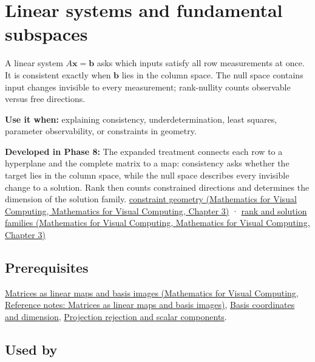 \hypertarget{appendix-8572a4a060c1}{}\label{referencestart:appendix-8572a4a060c1}
\section{Linear systems and fundamental subspaces}\label{appendix-8572a4a060c1-linear-systems-and-fundamental-subspaces}

A linear system \(A\mathbf x=\mathbf b\) asks which inputs satisfy all row measurements at once. It is consistent exactly when \(\mathbf b\) lies in the column space. The null space contains input changes invisible to every measurement; rank-nullity counts observable versus free directions.

\textbf{Use it when:} explaining consistency, underdetermination, least squares, parameter observability, or constraints in geometry.

\textbf{Developed in Phase 8:} The expanded treatment connects each row to a hyperplane and the complete matrix to a map: consistency asks whether the target lies in the column space, while the null space describes every invisible change to a solution. Rank then counts constrained directions and determines the dimension of the solution family. \href{../02-Mathematics-for-Visual-Computing/main.pdf\#nameddest=01-foundations-i-ch019-a-system-is-an-intersection-of-constraints}{constraint geometry (Mathematics for Visual Computing, Mathematics for Visual Computing, Chapter 3)} · \href{../02-Mathematics-for-Visual-Computing/main.pdf\#nameddest=01-foundations-i-ch019-rank-the-four-spaces-and-the-shape-of-the-answer}{rank and solution families (Mathematics for Visual Computing, Mathematics for Visual Computing, Chapter 3)}

\subsection{Prerequisites}\label{appendix-8572a4a060c1-prerequisites}

\href{../02-Mathematics-for-Visual-Computing/main.pdf\#nameddest=appendix-bd39c3bf5d64}{Matrices as linear maps and basis images (Mathematics for Visual Computing, Reference notes: Matrices as linear maps and basis images)}, \hyperref[appendix-ce0341f7ea0d]{Basis coordinates and dimension}, \hyperref[appendix-505a502c372a]{Projection rejection and scalar components}.

\subsection{Used by}\label{appendix-8572a4a060c1-used-by}

